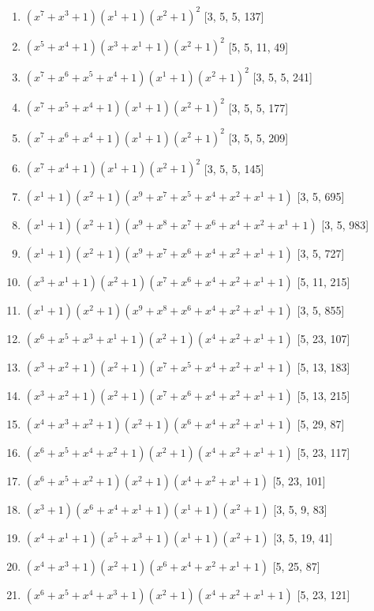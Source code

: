 \documentclass[10pt,twocolumn]{article}
\begin{document}
\begin{enumerate}
\item $(x^{7} + x^{3} + 1)(x^{1} + 1)(x^{2} + 1)^{2}$  [3, 5, 5, 137]
\item $(x^{5} + x^{4} + 1)(x^{3} + x^{1} + 1)(x^{2} + 1)^{2}$  [5, 5, 11, 49]
\item $(x^{7} + x^{6} + x^{5} + x^{4} + 1)(x^{1} + 1)(x^{2} + 1)^{2}$  [3, 5, 5, 241]
\item $(x^{7} + x^{5} + x^{4} + 1)(x^{1} + 1)(x^{2} + 1)^{2}$  [3, 5, 5, 177]
\item $(x^{7} + x^{6} + x^{4} + 1)(x^{1} + 1)(x^{2} + 1)^{2}$  [3, 5, 5, 209]
\item $(x^{7} + x^{4} + 1)(x^{1} + 1)(x^{2} + 1)^{2}$  [3, 5, 5, 145]
\item $(x^{1} + 1)(x^{2} + 1)(x^{9} + x^{7} + x^{5} + x^{4} + x^{2} + x^{1} + 1)$  [3, 5, 695]
\item $(x^{1} + 1)(x^{2} + 1)(x^{9} + x^{8} + x^{7} + x^{6} + x^{4} + x^{2} + x^{1} + 1)$  [3, 5, 983]
\item $(x^{1} + 1)(x^{2} + 1)(x^{9} + x^{7} + x^{6} + x^{4} + x^{2} + x^{1} + 1)$  [3, 5, 727]
\item $(x^{3} + x^{1} + 1)(x^{2} + 1)(x^{7} + x^{6} + x^{4} + x^{2} + x^{1} + 1)$  [5, 11, 215]
\item $(x^{1} + 1)(x^{2} + 1)(x^{9} + x^{8} + x^{6} + x^{4} + x^{2} + x^{1} + 1)$  [3, 5, 855]
\item $(x^{6} + x^{5} + x^{3} + x^{1} + 1)(x^{2} + 1)(x^{4} + x^{2} + x^{1} + 1)$  [5, 23, 107]
\item $(x^{3} + x^{2} + 1)(x^{2} + 1)(x^{7} + x^{5} + x^{4} + x^{2} + x^{1} + 1)$  [5, 13, 183]
\item $(x^{3} + x^{2} + 1)(x^{2} + 1)(x^{7} + x^{6} + x^{4} + x^{2} + x^{1} + 1)$  [5, 13, 215]
\item $(x^{4} + x^{3} + x^{2} + 1)(x^{2} + 1)(x^{6} + x^{4} + x^{2} + x^{1} + 1)$  [5, 29, 87]
\item $(x^{6} + x^{5} + x^{4} + x^{2} + 1)(x^{2} + 1)(x^{4} + x^{2} + x^{1} + 1)$  [5, 23, 117]
\item $(x^{6} + x^{5} + x^{2} + 1)(x^{2} + 1)(x^{4} + x^{2} + x^{1} + 1)$  [5, 23, 101]
\item $(x^{3} + 1)(x^{6} + x^{4} + x^{1} + 1)(x^{1} + 1)(x^{2} + 1)$  [3, 5, 9, 83]
\item $(x^{4} + x^{1} + 1)(x^{5} + x^{3} + 1)(x^{1} + 1)(x^{2} + 1)$  [3, 5, 19, 41]
\item $(x^{4} + x^{3} + 1)(x^{2} + 1)(x^{6} + x^{4} + x^{2} + x^{1} + 1)$  [5, 25, 87]
\item $(x^{6} + x^{5} + x^{4} + x^{3} + 1)(x^{2} + 1)(x^{4} + x^{2} + x^{1} + 1)$  [5, 23, 121]

\end{enumerate}
\end{document}
